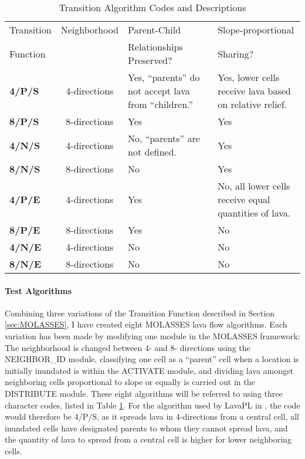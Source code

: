 	\begin{center}
		\begin{table}[h]
		\caption{Transition Algorithm Codes and Descriptions}
		\begin{tabular}{l c p{5cm} p{5cm}}
			\toprule
			Transition&Neighborhood&Parent-Child&Slope-proportional\\
			Function&&Relationships Preserved?&Sharing?\\
			\midrule
			\textbf{4/P/S} &4-directions & Yes, ``parents'' do not accept lava from ``children.'' & Yes, lower cells receive lava based on relative relief.\\
			\textbf{8/P/S} &8-directions & Yes & Yes\\
			\textbf{4/N/S} &4-directions & No, ``parents'' are not defined. & Yes\\
			\textbf{8/N/S} &8-directions & No  & Yes\\
			\textbf{4/P/E} &4-directions & Yes & No, all lower cells receive equal quantities of lava.\\
			\textbf{8/P/E} &8-directions & Yes & No\\
			\textbf{4/N/E} &4-directions & No  & No\\
			\textbf{8/N/E} &8-directions & No  & No\\
			
			\bottomrule
		\end{tabular}
		\label{tab_algorithmcodes}
		\end{table}
	\end{center}

\paragraph{Test Algorithms} Combining three variations of the Transition Function described in Section \ref{sec:MOLASSES}, I have created eight MOLASSES lava flow algorithms. Each variation has been made by modifying one module in the MOLASSES framework: The neighborhood is changed between 4- and 8- directions using the NEIGHBOR\_ID module, classifying one cell as a ``parent'' cell when a location is initially inundated is within the ACTIVATE module, and dividing lava amongst neighboring cells proportional to slope or equally is carried out in the DISTRIBUTE module. These eight algorithms will be referred to using three character codes, listed in Table \ref{tab_algorithmcodes}. For the algorithm used by LavaPL in \citet{connor2012}, the code would therefore be 4/P/S, as it spreads lava in 4-directions from a central cell, all inundated cells have designated parents to whom they cannot spread lava, and the quantity of lava to spread from a central cell is higher for lower neighboring cells.

